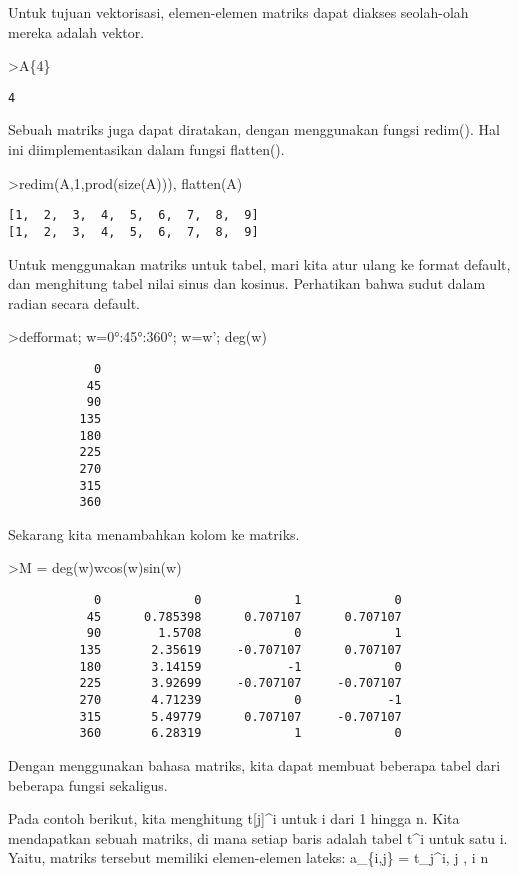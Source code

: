 \documentclass[
]{book}
\begin{document}
Untuk tujuan vektorisasi, elemen-elemen matriks dapat diakses seolah-olah mereka adalah vektor.

\textgreater A\{4\}

\begin{verbatim}
4
\end{verbatim}

Sebuah matriks juga dapat diratakan, dengan menggunakan fungsi redim(). Hal ini diimplementasikan dalam fungsi flatten().

\textgreater redim(A,1,prod(size(A))), flatten(A)

\begin{verbatim}
[1,  2,  3,  4,  5,  6,  7,  8,  9]
[1,  2,  3,  4,  5,  6,  7,  8,  9]
\end{verbatim}

Untuk menggunakan matriks untuk tabel, mari kita atur ulang ke format default, dan menghitung tabel nilai sinus dan kosinus. Perhatikan bahwa sudut dalam radian secara default.

\textgreater defformat; w=0°:45°:360°; w=w'; deg(w)

\begin{verbatim}
            0 
           45 
           90 
          135 
          180 
          225 
          270 
          315 
          360 
\end{verbatim}

Sekarang kita menambahkan kolom ke matriks.

\textgreater M = deg(w)\textbar w\textbar cos(w)\textbar sin(w)

\begin{verbatim}
            0             0             1             0 
           45      0.785398      0.707107      0.707107 
           90        1.5708             0             1 
          135       2.35619     -0.707107      0.707107 
          180       3.14159            -1             0 
          225       3.92699     -0.707107     -0.707107 
          270       4.71239             0            -1 
          315       5.49779      0.707107     -0.707107 
          360       6.28319             1             0 
\end{verbatim}

Dengan menggunakan bahasa matriks, kita dapat membuat beberapa tabel dari beberapa fungsi sekaligus.

Pada contoh berikut, kita menghitung t{[}j{]}\^{}i untuk i dari 1 hingga n. Kita mendapatkan sebuah matriks, di mana setiap baris adalah tabel t\^{}i untuk satu i. Yaitu, matriks tersebut memiliki elemen-elemen lateks: a\_\{i,j\} = t\_j\^{}i,  \le j ,  \le i \le n
\end{document}
